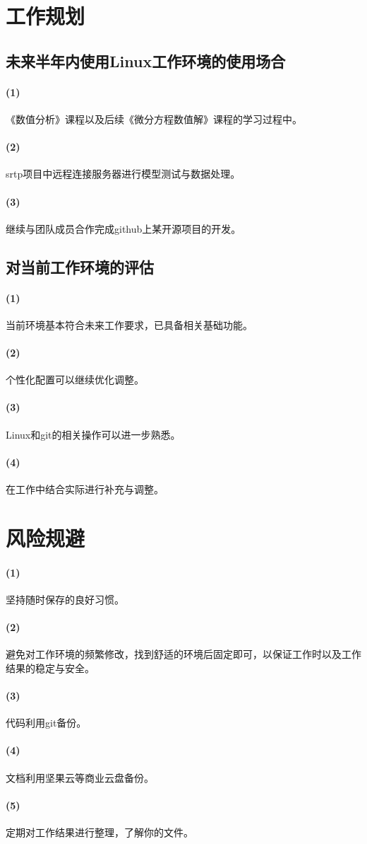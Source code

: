 \documentclass{article}
\begin{document}
	\section{工作规划}
	\subsection{未来半年内使用Linux工作环境的使用场合}
	   \paragraph{(1)}《数值分析》课程以及后续《微分方程数值解》课程的学习过程中。
	   \paragraph{(2)}srtp项目中远程连接服务器进行模型测试与数据处理。
	   \paragraph{(3)}继续与团队成员合作完成github上某开源项目的开发。
	  \subsection{对当前工作环境的评估}
	  	   \paragraph{(1)}当前环境基本符合未来工作要求，已具备相关基础功能。
	  	   \paragraph{(2)}个性化配置可以继续优化调整。
	  	   \paragraph{(3)}Linux和git的相关操作可以进一步熟悉。
	  	   \paragraph{(4)}在工作中结合实际进行补充与调整。
	 \section{风险规避}
	        \paragraph{(1)}坚持随时保存的良好习惯。
	        \paragraph{(2)}避免对工作环境的频繁修改，找到舒适的环境后固定即可，以保证工作时以及工作结果的稳定与安全。
	        \paragraph{(3)}代码利用git备份。
	        \paragraph{(4)}文档利用坚果云等商业云盘备份。
	        \paragraph{(5)}定期对工作结果进行整理，了解你的文件。   
	           


\end{document}
